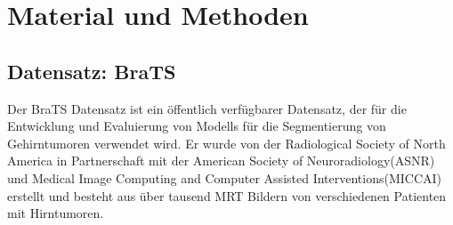 \chapter{Material und Methoden}
\section{Datensatz: \ac{BraTS}}
Der \ac{BraTS} Datensatz ist ein öffentlich verfügbarer Datensatz, der für die Entwicklung und Evaluierung von \glspl{Modell} für die Segmentierung von Gehirntumoren verwendet wird. Er wurde von der Radiological Society of North America in Partnerschaft mit der American Society of Neuroradiology(ASNR) und Medical Image Computing and Computer Assisted Interventions(MICCAI) erstellt und besteht aus über tausend \ac{MRT} Bildern von verschiedenen Patienten mit Hirntumoren. \cite[vgl.][]{RSNABrainTumor2021}

